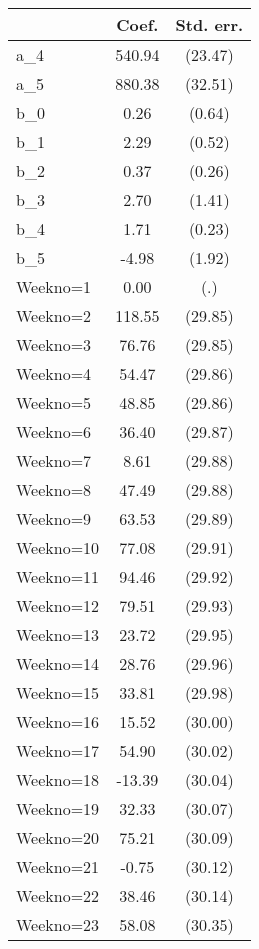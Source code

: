 {
\def\sym#1{\ifmmode^{#1}\else\(^{#1}\)\fi}
\begin{tabular}{l*{1}{cc}}
\hline\hline
                &    Coef.&Std. err.\\
\hline
a\_4             &   540.94&  (23.47)\\
a\_5             &   880.38&  (32.51)\\
b\_0             &     0.26&   (0.64)\\
b\_1             &     2.29&   (0.52)\\
b\_2             &     0.37&   (0.26)\\
b\_3             &     2.70&   (1.41)\\
b\_4             &     1.71&   (0.23)\\
b\_5             &    -4.98&   (1.92)\\
Weekno=1        &     0.00&      (.)\\
Weekno=2        &   118.55&  (29.85)\\
Weekno=3        &    76.76&  (29.85)\\
Weekno=4        &    54.47&  (29.86)\\
Weekno=5        &    48.85&  (29.86)\\
Weekno=6        &    36.40&  (29.87)\\
Weekno=7        &     8.61&  (29.88)\\
Weekno=8        &    47.49&  (29.88)\\
Weekno=9        &    63.53&  (29.89)\\
Weekno=10       &    77.08&  (29.91)\\
Weekno=11       &    94.46&  (29.92)\\
Weekno=12       &    79.51&  (29.93)\\
Weekno=13       &    23.72&  (29.95)\\
Weekno=14       &    28.76&  (29.96)\\
Weekno=15       &    33.81&  (29.98)\\
Weekno=16       &    15.52&  (30.00)\\
Weekno=17       &    54.90&  (30.02)\\
Weekno=18       &   -13.39&  (30.04)\\
Weekno=19       &    32.33&  (30.07)\\
Weekno=20       &    75.21&  (30.09)\\
Weekno=21       &    -0.75&  (30.12)\\
Weekno=22       &    38.46&  (30.14)\\
Weekno=23       &    58.08&  (30.35)\\

\end{tabular}}

